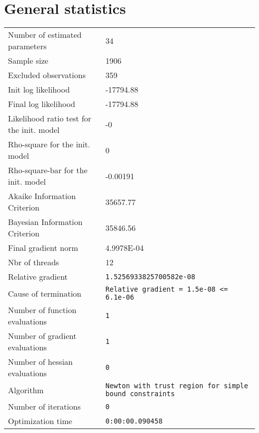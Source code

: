 



\section{General statistics}
\begin{tabular}{ll}
Number of estimated parameters & 34 \\
Sample size & 1906 \\
Excluded observations & 359 \\
Init log likelihood & -17794.88 \\
Final log likelihood & -17794.88 \\
Likelihood ratio test for the init. model & -0 \\
Rho-square for the init. model & 0 \\
Rho-square-bar for the init. model & -0.00191 \\
Akaike Information Criterion & 35657.77 \\
Bayesian Information Criterion & 35846.56 \\
Final gradient norm & 4.9978E-04 \\
Nbr of threads & 12 \\
Relative gradient & \verb$1.5256933825700582e-08$ \\
Cause of termination & \verb$Relative gradient = 1.5e-08 <= 6.1e-06$ \\
Number of function evaluations & \verb$1$ \\
Number of gradient evaluations & \verb$1$ \\
Number of hessian evaluations & \verb$0$ \\
Algorithm & \verb$Newton with trust region for simple bound constraints$ \\
Number of iterations & \verb$0$ \\
Optimization time & \verb$0:00:00.090458$ \\
\end{tabular}

